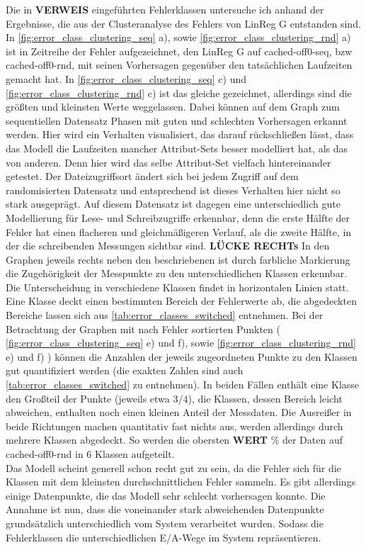 \documentclass[
	12pt,
	a4paper,
	BCOR10mm,
	DIV14,
	listof=totoc,
	bibliography=totoc,
	headsepline
]{scrreprt}
\begin{document}
Die in \textbf{VERWEIS} eingeführten Fehlerklassen untersuche ich anhand der Ergebnisse, die aus der Clusteranalyse des Fehlers von LinReg G entstanden sind.
In \ref{fig:error_class_clustering_seq} a), sowie \ref{fig:error_class_clustering_rnd} a) ist in Zeitreihe der Fehler aufgezeichnet, den LinReg G auf cached-off0-seq, bzw cached-off0-rnd, mit seinen Vorhersagen gegenüber den tatsächlichen Laufzeiten gemacht hat. In \ref{fig:error_class_clustering_seq} c) und \ref{fig:error_class_clustering_rnd} c) ist das gleiche gezeichnet, allerdings sind die größten und kleinsten Werte weggelassen. Dabei können auf dem Graph zum sequentiellen Datensatz Phasen mit guten und schlechten Vorhersagen erkannt werden. Hier wird ein Verhalten visualisiert, das darauf rückschließen lässt, dass das Modell die Laufzeiten mancher Attribut-Sets besser modelliert hat, als das von anderen. Denn hier wird das selbe Attribut-Set vielfach hintereinander getestet. Der Dateizugriffsort ändert sich bei jedem Zugriff auf dem randomisierten Datensatz und entsprechend ist dieses Verhalten hier nicht so stark ausgeprägt. Auf diesem Datensatz ist dagegen eine unterschiedlich gute Modellierung für Lese- und Schreibzugriffe erkennbar, denn die erste Hälfte der Fehler hat einen flacheren und gleichmäßigeren Verlauf, als die zweite Hälfte, in der die schreibenden Messungen sichtbar sind. \textbf{LÜCKE RECHTs}
In den Graphen jeweils rechts neben den beschriebenen ist durch farbliche Markierung die Zugehörigkeit der Messpunkte zu den unterschiedlichen Klassen erkennbar. Die Unterscheidung in verschiedene Klassen findet in horizontalen Linien statt. Eine Klasse deckt einen bestimmten Bereich der Fehlerwerte ab, die abgedeckten Bereiche lassen sich aus \ref{tab:error_classes_switched} entnehmen. 
Bei der Betrachtung der Graphen mit nach Fehler sortierten Punkten ( \ref{fig:error_class_clustering_seq} e) und f), sowie \ref{fig:error_class_clustering_rnd} e) und f) ) können die Anzahlen der jeweils zugeordneten Punkte zu den Klassen gut quantifiziert werden (die exakten Zahlen sind auch \ref{tab:error_classes_switched} zu entnehmen). In beiden Fällen enthält eine Klasse den Großteil der Punkte (jeweils etwa $3/4$), die Klassen, dessen Bereich leicht abweichen, enthalten noch einen kleinen Anteil der Messdaten. Die Ausreißer in beide Richtungen machen quantitativ fast nichts aus, werden allerdings durch mehrere Klassen abgedeckt. So werden die obersten \textbf{WERT} \% der Daten auf cached-off0-rnd in 6 Klassen aufgeteilt.\\
Das Modell scheint generell schon recht gut zu sein, da die Fehler sich für die Klassen mit dem kleinsten durchschnittlichen Fehler sammeln. Es gibt allerdings einige Datenpunkte, die das Modell sehr schlecht vorhersagen konnte. Die Annahme ist nun, dass die voneinander stark abweichenden Datenpunkte grundsätzlich unterschiedlich vom System verarbeitet wurden. Sodass die Fehlerklassen die unterschiedlichen E/A-Wege im System repräsentieren. 
\end{document}
